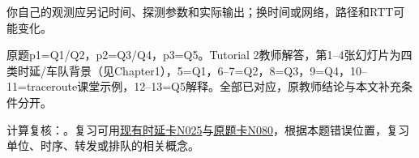 你自己的观测应另记时间、探测参数和实际输出；换时间或网络，路径和RTT可能变化。





原题p1=Q1/Q2，p2=Q3/Q4，p3=Q5。Tutorial 2教师解答，第1–4张幻灯片为四类时延/车队背景（见Chapter1），5=Q1，6–7=Q2，8=Q3，9=Q4，10–11=traceroute课堂示例，12–13=Q5解释。全部已对应，原教师结论与本文补充条件分开。


计算复核：。复习可用\href{https://crazyshout.github.io/micro-course/cards.html\#CS5222-N025}{现有时延卡N025}与\href{https://crazyshout.github.io/micro-course/cards.html\#CS5222-N080}{原题卡N080}，根据本题错误位置，复习单位、时序、转发或排队的相关概念。
